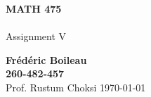 \begin{titlepage}
\begin{center}
	\vspace*{1cm}
	\textbf{MATH 475}\\
	\\
	\vspace{0.5cm}
	Assignment V
	
	\vspace{1.5cm}
	
	\textbf{Frédéric Boileau}\\
	\textbf{260-482-457}\\
	\vspace{2cm}
	Prof. 
	Rustum Choksi
	\vfill
	\today
	\thispagestyle{empty}
\end{center}
\end{titlepage}
